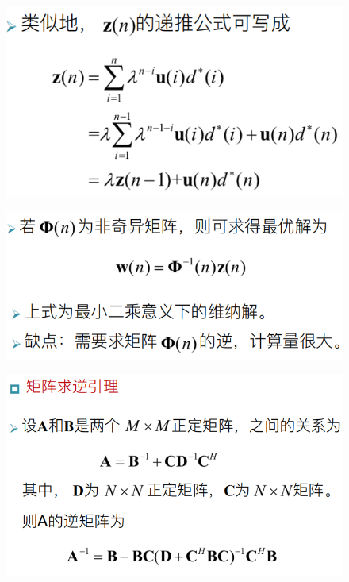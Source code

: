 \documentclass[UTF8]{ctexart} %
\begin{document}
				\begin{figure}[H]
					\centering\includegraphics[scale=0.4]{56.png}
				\end{figure}
				\begin{figure}[H]
					\centering\includegraphics[scale=0.4]{57.png}
				\end{figure}
				\begin{figure}[H]
					\centering\includegraphics[scale=0.4]{58.png}
				\end{figure}
\end{document}
